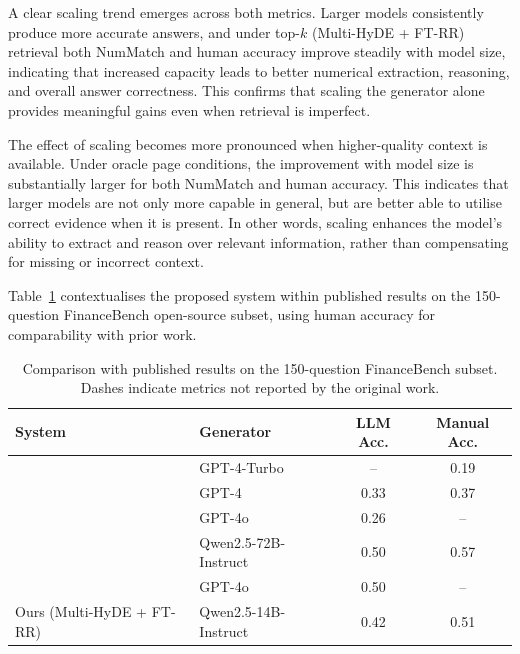 \documentclass[12pt,twoside,maitrise]{dms}
\theoremstyle{definition}
\numberwithin{equation}{section}
\numberwithin{table}{chapter}
\numberwithin{figure}{chapter}
\begin{document}
A clear scaling trend emerges across both metrics. Larger models consistently produce more accurate answers, and under top-$k$ (Multi-HyDE + FT-RR) retrieval both NumMatch and human accuracy improve steadily with model size, indicating that increased capacity leads to better numerical extraction, reasoning, and overall answer correctness. This confirms that scaling the generator alone provides meaningful gains even when retrieval is imperfect.

The effect of scaling becomes more pronounced when higher-quality context is available.
Under oracle page conditions, the improvement with model size is substantially larger
for both NumMatch and human accuracy. This indicates that larger models are not only
more capable in general, but are better able to utilise correct evidence when it is
present. In other words, scaling enhances the model’s ability to extract and reason over
relevant information, rather than compensating for missing or incorrect context.

Table~\ref{tab:sota} contextualises the proposed system within published results on the 150-question FinanceBench open-source subset, using human accuracy for comparability with prior work.


\begin{table}[ht]
\centering

\small
\begin{tabular}{llcc}
\toprule
\textbf{System} & \textbf{Generator} & \textbf{LLM Acc.} & \textbf{Manual Acc.} \\
\midrule
\citet{islam2023financebench}  & GPT-4-Turbo            & --   & 0.19 \\
\citet{jimeno2024financial}    & GPT-4                  & 0.33 & 0.37 \\
\citet{setty2024improving}     & GPT-4o                 & 0.26 & --   \\
\citet{wang2024finsage}        & Qwen2.5-72B-Instruct   & 0.50 & 0.57 \\
\citet{choe2025hirec}          & GPT-4o                 & 0.50 & --   \\
\midrule
Ours (Multi-HyDE + FT-RR)     & Qwen2.5-14B-Instruct   & 0.42 & 0.51 \\
\bottomrule
\end{tabular}
\caption{Comparison with published results on the 150-question FinanceBench subset.
  Dashes indicate metrics not reported by the original work.}
\label{tab:sota}
\end{table}
\end{document}
